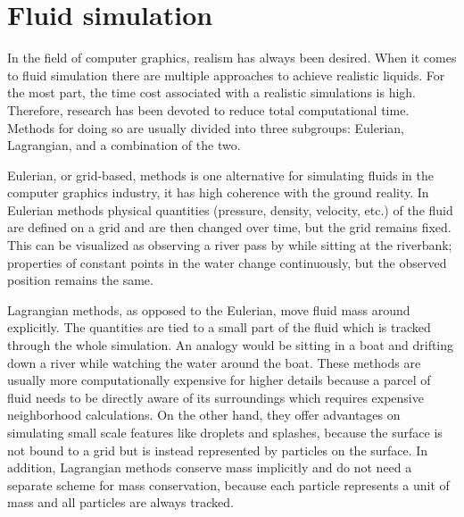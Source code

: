 \documentclass[../../main.tex]{subfiles}
\begin{document}
\tracingall


\section{Fluid simulation}
In the field of computer graphics, realism has always been desired. When it comes to fluid simulation there are multiple approaches to achieve realistic liquids. For the most part, the time cost associated with a realistic simulations is high. Therefore, research has been devoted to reduce total computational time. Methods for doing so are usually divided into three subgroups: Eulerian, Lagrangian, and a combination of the two.



Eulerian, or grid-based, methods is one alternative for simulating fluids in the computer graphics industry, it has high coherence with the ground reality. In Eulerian methods physical quantities (pressure, density, velocity, etc.) of the fluid are defined on a grid and are then changed over time, but the grid remains fixed. This can be visualized as observing a river pass by while sitting at the riverbank; properties of constant points in the water change continuously, but the observed position remains the same. 

Lagrangian methods, as opposed to the Eulerian, move fluid mass around explicitly. The quantities are tied to a small part of the fluid which is tracked through the whole simulation. An analogy would be sitting in a boat and drifting down a river while watching the water around the boat. These methods are usually more computationally expensive for higher details because a parcel of fluid needs to be directly aware of its surroundings which requires expensive neighborhood calculations. On the other hand, they offer advantages on simulating small scale features like droplets and splashes, because the surface is not bound to a grid but is instead represented by particles on the surface. In addition, Lagrangian methods conserve mass implicitly and do not need a separate scheme for mass conservation, because each particle represents a unit of mass and all particles are always tracked. 
\end{document}
